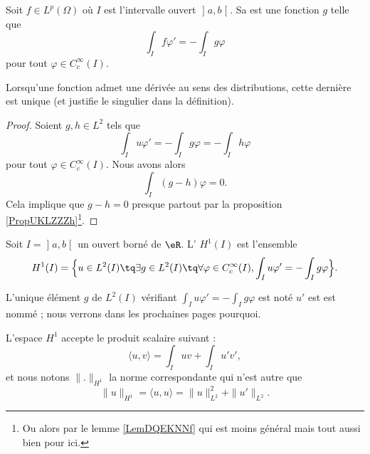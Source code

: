 \begin{definition}
    Soit \( f\in L^p(\Omega)\) où \( I\) est l'intervalle ouvert \( \mathopen] a , b \mathclose[\). Sa  est une fonction \( g\) telle que
        \begin{equation}
            \int_If\varphi'=-\int_Ig\varphi
        \end{equation}
        pour tout \( \varphi\in C^{\infty}_c(I)\).
\end{definition}

\begin{lemma}
    Lorsqu'une fonction admet une dérivée au sens des distributions, cette dernière est unique (et justifie le singulier dans la définition).
\end{lemma}

\begin{proof}
    Soient \( g,h\in L^2\) tels que 
    \begin{equation}
        \int_Iu\varphi'=-\int_Ig\varphi=-\int_Ih\varphi
    \end{equation}
    pour tout \( \varphi\in C^{\infty}_c(I)\). Nous avons alors
    \begin{equation}
        \int_I(g-h)\varphi=0.
    \end{equation}
    Cela implique que \( g-h=0\) presque partout par la proposition \ref{PropUKLZZZh}\footnote{Ou alors par le lemme \ref{LemDQEKNNf} qui est moins général mais tout aussi bien pour ici.}.
\end{proof}

\begin{definition}
    Soit \( I=\mathopen] a , b \mathclose[\) un ouvert borné de \( \eR\). L' \( H^1(I)\) est l'ensemble
    \begin{equation}
        H^1(I)=\Big\{   u\in L^2(I)\tq\exists g\in L^2(I)\tq\forall \varphi\in  C^{\infty}_c(I),\int_Iu\varphi'=-\int_Ig\varphi   \Big\}.
    \end{equation}
\end{definition}
 
L'unique élément \( g\) de \( L^2(I)\) vérifiant \( \int_Iu\varphi'=-\int_Ig\varphi\) est noté \( u'\) est est nommé ; nous verrons dans les prochaines pages pourquoi.

L'espace \( H^1\) accepte le produit scalaire suivant :
\begin{equation}
    \langle u, v\rangle =\int_Iuv+\int_Iu'v',
\end{equation}
et nous notons \( \| . \|_{H^1}\) la norme correspondante qui n'est autre que
\begin{equation}
    \| u \|_{H^1}=\langle u, u\rangle =\| u \|^2_{L^2}+\| u' \|_{L^2}.
\end{equation}

